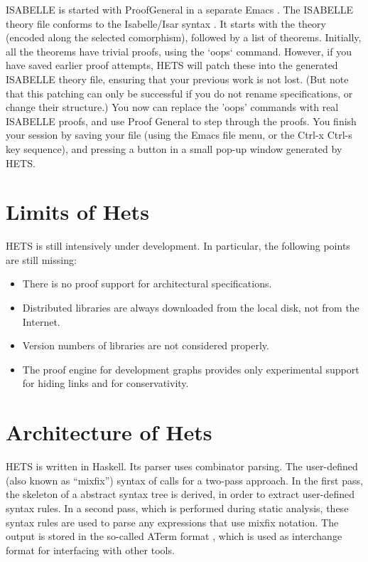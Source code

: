 \documentclass{article}
\newcommand{\normalTEXTSC}[2]{{#1\scriptsize#2}}
\newcommand     {\Hets}{\normalTEXTSC{H}{ETS}\xspace}
\newcommand     {\Isabelle}{\normalTEXTSC{I}{SABELLE}\xspace}
\begin{document}
\Isabelle is started with ProofGeneral
\cite{DBLP:conf/tacas/Aspinall00,url:ProofGeneral} in a separate Emacs
\cite{url:Emacs,url:XEmacs}.
The \Isabelle theory file conforms to the Isabelle/Isar syntax
\cite{NipPauWen02}. It starts with the theory (encoded along the selected
 comorphism), followed by a list of theorems. Initially, all the
 theorems have trivial proofs, using the `oops` command. However, if
 you have saved earlier proof attempts, \Hets will patch these into
 the generated \Isabelle theory file, ensuring that your previous work
 is not lost. (But note that this patching can only be successful
 if you do not rename specifications, or change their structure.)  You
 now can replace the 'oops' commands with real \Isabelle proofs, and
 use Proof General to step through the proofs. You finish your session
 by saving your file (using the Emacs file menu, or the Ctrl-x Ctrl-s
 key sequence), and pressing a button in a small pop-up window
 generated by \Hets.

\section{Limits of Hets}

\Hets is still intensively under development. In particular, the
following points are still missing:

\begin{itemize}
\item There is no proof support for architectural specifications.
\item Distributed libraries are always downloaded from the local disk,
not from the Internet.
\item Version numbers of libraries are not considered properly.
\item The proof engine for development graphs provides only experimental
support for hiding links and for conservativity.
\end{itemize}


\section{Architecture of Hets}

\Hets is written in Haskell. Its parser uses combinator 
parsing.
The user-defined (also known as ``mixfix'') syntax of \CASL
calls for a two-pass approach. In the first pass, the skeleton of a
\CASL abstract syntax tree is derived, in order to extract user-defined 
syntax rules. In a second pass, which is performed during 
static
analysis, these syntax rules are used to parse 
any expressions that
use mixfix notation. The output is stored in the so-called
ATerm format \cite{BJKO00}, which is used as interchange format
for interfacing with other tools.
\end{document}

